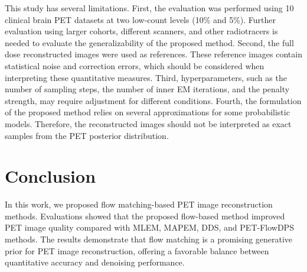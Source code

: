 \documentclass[journal]{IEEEtran}
\begin{document}
This study has several limitations. First, the evaluation was performed using 10 clinical brain PET datasets at two low-count levels (10\% and 5\%). Further evaluation using larger cohorts, different scanners, and other radiotracers is needed to evaluate the generalizability of the proposed method. Second, the full dose reconstructed images were used as references. These reference images contain statistical noise and correction errors, which should be considered when interpreting these quantitative measures. Third, hyperparameters, such as the number of sampling steps, the number of inner EM iterations, and the penalty strength, may require adjustment for different conditions. Fourth, the formulation of the proposed method relies on several approximations for some probabilistic models. Therefore, the reconstructed images should not be interpreted as exact samples from the PET posterior distribution.

\section{Conclusion}
In this work, we proposed flow matching-based PET image reconstruction methods. Evaluations showed that the proposed flow-based method improved PET image quality compared with MLEM, MAPEM, DDS, and PET-FlowDPS methods. The results demonstrate that flow matching is a promising generative prior for PET image reconstruction, offering a favorable balance between quantitative accuracy and denoising performance.



\end{document}
